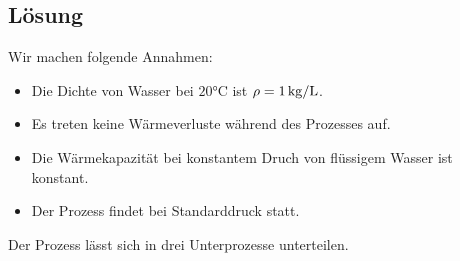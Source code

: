 \documentclass[german,12pt]{homework}
\begin{document}
    \subsection*{Lösung} Wir machen folgende Annahmen:
    \begin{itemize}
        \item Die Dichte von Wasser bei \(20\si{\degreeCelsius}\) ist \(\rho = 1\,\si{\kg\per{\liter}}\).
        \item Es treten keine Wärmeverluste während des Prozesses auf.
        \item Die Wärmekapazität bei konstantem Druch von flüssigem Wasser ist konstant.
        \item Der Prozess findet bei Standarddruck statt.
    \end{itemize}
    Der Prozess lässt sich in drei Unterprozesse unterteilen.
\end{document}
